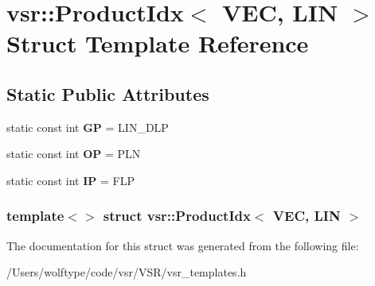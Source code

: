 \hypertarget{structvsr_1_1_product_idx_3_01_v_e_c_00_01_l_i_n_01_4}{\section{vsr\-:\-:Product\-Idx$<$ V\-E\-C, L\-I\-N $>$ Struct Template Reference}
\label{structvsr_1_1_product_idx_3_01_v_e_c_00_01_l_i_n_01_4}
}
\subsection*{Static Public Attributes}
\begin{DoxyCompactItemize}
\item 
\hypertarget{structvsr_1_1_product_idx_3_01_v_e_c_00_01_l_i_n_01_4_ad8a782d93f8371153189b2bb6ecaa7a1}{static const int {\bfseries G\-P} = L\-I\-N\-\_\-\-D\-L\-P}\label{structvsr_1_1_product_idx_3_01_v_e_c_00_01_l_i_n_01_4_ad8a782d93f8371153189b2bb6ecaa7a1}

\item 
\hypertarget{structvsr_1_1_product_idx_3_01_v_e_c_00_01_l_i_n_01_4_a335ffa376527165569798892df3f2d0c}{static const int {\bfseries O\-P} = P\-L\-N}\label{structvsr_1_1_product_idx_3_01_v_e_c_00_01_l_i_n_01_4_a335ffa376527165569798892df3f2d0c}

\item 
\hypertarget{structvsr_1_1_product_idx_3_01_v_e_c_00_01_l_i_n_01_4_ad8d325caf8e197e1f9a13ad744c14c1b}{static const int {\bfseries I\-P} = F\-L\-P}\label{structvsr_1_1_product_idx_3_01_v_e_c_00_01_l_i_n_01_4_ad8d325caf8e197e1f9a13ad744c14c1b}

\end{DoxyCompactItemize}
\subsubsection*{template$<$$>$ struct vsr\-::\-Product\-Idx$<$ V\-E\-C, L\-I\-N $>$}



The documentation for this struct was generated from the following file\-:\begin{DoxyCompactItemize}
\item 
/\-Users/wolftype/code/vsr/\-V\-S\-R/vsr\-\_\-templates.\-h\end{DoxyCompactItemize}
